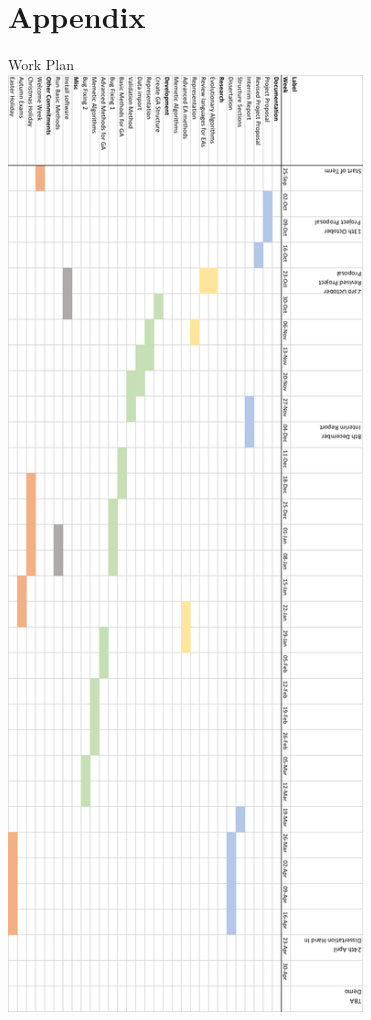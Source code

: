 \documentclass[a4paper]{article}
\begin{document}
\section{Appendix}



\clearpage
\begin{center}
    \Large{Work Plan}\\
\includegraphics[height=24.8cm]{workPlanOLD.png}
\end{center}
\end{document}
